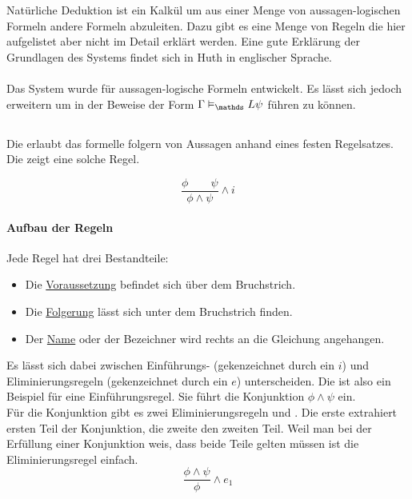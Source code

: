 
\section{\ND} %
\label{sub:natuerliche_folgerung}
Natürliche Deduktion ist ein Kalkül um aus einer Menge von aussagen-logischen Formeln andere Formeln abzuleiten.
Dazu gibt es eine Menge von Regeln die hier aufgelistet aber nicht im Detail erklärt werden.
Eine gute Erklärung der Grundlagen des Systems findet sich in Huth \cite[Kapitel 1.2 (natural deduction)]{huth2004logic} in englischer Sprache.\\
\\
Das System wurde für aussagen-logische Formeln entwickelt. Es lässt sich jedoch erweitern um in der \ML Beweise der Form $\Gamma \vDash_\Menge{L} \psi$ führen zu können.\\

\subsection{\ND \AL} %
\label{par:natuerliche_deduktion_aussagenlogick}
Die \ND erlaubt das formelle folgern von Aussagen anhand eines festen Regelsatzes.
Die  zeigt eine solche Regel.

\begin{equation}
	\label{eq:iConjunction}
	\frac{\phi \qquad \psi}{\phi \wedge \psi} \wedge i
\end{equation}	

\paragraph{Aufbau der Regeln}

Jede Regel hat drei Bestandteile:
\begin{itemize}
	\item Die \underline{Voraussetzung} befindet sich über dem Bruchstrich.
	\item Die \underline{Folgerung} lässt sich unter dem Bruchstrich finden.
	\item Der \underline{Name} oder der Bezeichner wird rechts an die Gleichung angehangen.
\end{itemize}
Es lässt sich dabei zwischen Einführungs- (gekenzeichnet durch ein $i$) und Eliminierungsregeln (gekenzeichnet durch ein $e$) unterscheiden.
Die  ist also ein Beispiel für eine Einführungsregel.
Sie führt die Konjunktion $\phi \wedge \psi$ ein.\\
Für die Konjunktion gibt es zwei Eliminierungsregeln  und .
Die erste extrahiert ersten Teil der Konjunktion, die zweite den zweiten Teil.
Weil man bei der Erfüllung einer Konjunktion weis, dass beide Teile gelten müssen ist die Eliminierungsregel einfach.\\
%
\begin{equation}
	\label{eq:e1Conjunction}
	\frac{\phi \wedge \psi}{\phi} \wedge e_1
\end{equation}

